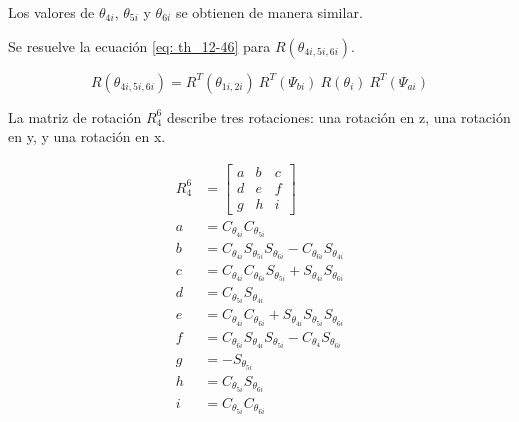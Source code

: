 Los valores de 
$\theta_{4i}$, $\theta_{5i}$ y $\theta_{6i}$ 
se obtienen de manera similar.

Se resuelve la ecuación \eqref{eq: th_12-46} para 
$R(\theta_{4i,5i,6i})$.

\begin{equation}\label{eq: resp_456}
    R(\theta_{4i,5i,6i})= R^T(\theta_{1i,2i})\ R^T(\Psi_{bi})\ R(\theta_i)\ R^T(\Psi_{ai})
\end{equation}

La matriz de rotación $R_4^6$ describe tres rotaciones: 
una rotación en z, una rotación en y, y una rotación en x.

\begin{subequations}
    \begin{align}
R_4^6 &= \begin{bmatrix}
         a & b & c\\
         d & e & f\\
         g & h & i
        \end{bmatrix}\label{eq: rot_456}\\
a &= C_{\theta_{4i}} C_{\theta_{5i}}\\ 
b &= C_{\theta_{4i}} S_{\theta_{5i}} S_{\theta_{6i}} - C_{\theta_{6i}} S_{\theta_{4i}}\\
c &= C_{\theta_{4i}} C_{\theta_{6i}} S_{\theta_{5i}} + S_{\theta_{4i}} S_{\theta_{6i}}\\
d &= C_{\theta_{5i}}S_{\theta_{4i}}\\
e &= C_{\theta_{4i}} C_{\theta_{6i}} + S_{\theta_{4i}} S_{\theta_{5i}} S_{\theta_{6i}}\\
f &= C_{\theta_{6i}} S_{\theta_{4i}} S_{\theta_{5i}} - C_{\theta_{4}} S_{\theta_{6i}}\\
g &= -S_{\theta_{5i}}\\
h &= C_{\theta_{5i}} S_{\theta_{6i}}\\
i &= C_{\theta_{5i}} C_{\theta_{6i}}
    \end{align}
\end{subequations}

